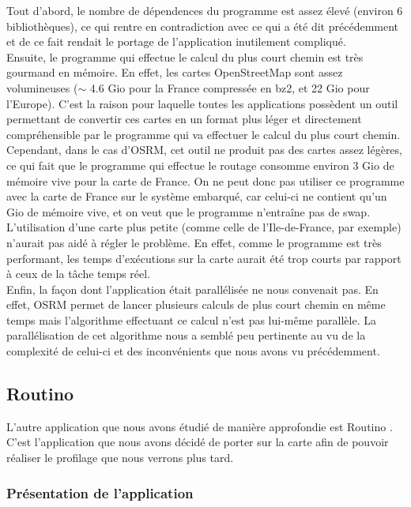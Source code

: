 Tout d'abord, le nombre de dépendences du programme est assez élevé (environ 
6 bibliothèques), ce qui rentre en contradiction avec ce qui a été dit 
précédemment et de ce fait rendait le portage de l'application inutilement
compliqué.\\
Ensuite, le programme qui effectue le calcul du plus court chemin est très 
gourmand en mémoire. En effet, les cartes OpenStreetMap sont assez volumineuses
($\sim$ 4.6 Gio pour la France compressée en bz2, et 22 Gio pour l'Europe). C'est
la raison pour laquelle toutes les applications possèdent un outil permettant 
de convertir ces cartes en un format plus léger et directement compréhensible 
par le programme qui va effectuer le calcul du plus court chemin. Cependant, 
dans le cas d'OSRM, cet outil ne produit pas des cartes assez légères, ce qui 
fait que le programme qui effectue le routage consomme environ 3 Gio de mémoire 
vive pour la carte de France. On ne peut donc pas utiliser ce programme avec la 
carte de France sur le système embarqué, car celui-ci ne contient qu'un Gio de 
mémoire vive, et on veut que le programme n'entraîne pas de swap. L'utilisation 
d'une carte plus petite (comme celle de l'Ile-de-France, par exemple) n'aurait 
pas aidé à régler le problème. En effet, comme le programme est très performant,
les temps d'exécutions sur la carte aurait été trop courts par rapport à ceux 
de la tâche temps réel.\\
Enfin, la façon dont l'application était parallélisée ne nous convenait pas. En 
effet, OSRM permet de lancer plusieurs calculs de plus court chemin en même 
temps mais l'algorithme effectuant ce calcul n'est pas lui-même parallèle. 
La parallélisation de cet algorithme nous a semblé peu pertinente au vu de la 
complexité de celui-ci et des inconvénients que nous avons vu précédemment.

\subsection{Routino}

L'autre application que nous avons étudié de manière approfondie est Routino 
\cite{bishop_routino_????}. C'est l'application que nous avons décidé de
porter sur la carte afin de pouvoir réaliser le profilage que nous verrons plus
tard.

\subsubsection{Présentation de l'application}

